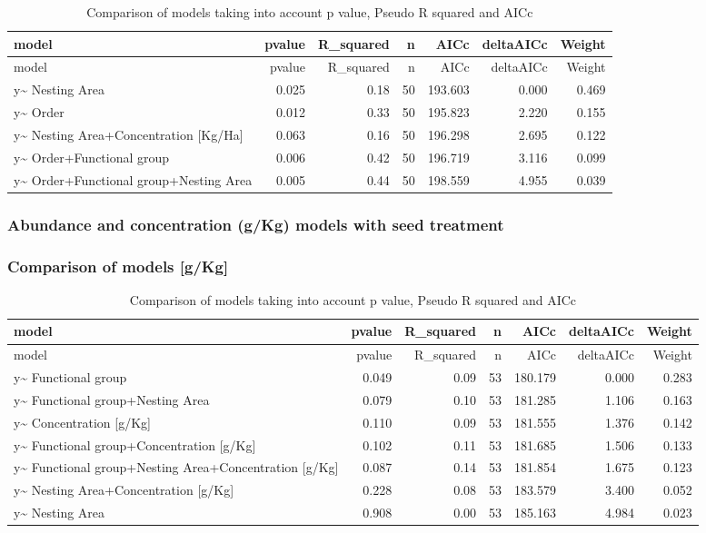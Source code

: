 \documentclass[]{elsarticle} %
\begin{document}
\begin{longtable}[c]{@{}lrrrrrr@{}}
\caption{Comparison of models taking into account p value, Pseudo R
squared and AICc}\tabularnewline
\toprule
model & pvalue & R\_squared & n & AICc & deltaAICc &
Weight\tabularnewline
\midrule
\endfirsthead
\toprule
model & pvalue & R\_squared & n & AICc & deltaAICc &
Weight\tabularnewline
\midrule
\endhead
y\textasciitilde{} Nesting Area & 0.025 & 0.18 & 50 & 193.603 & 0.000 &
0.469\tabularnewline
y\textasciitilde{} Order & 0.012 & 0.33 & 50 & 195.823 & 2.220 &
0.155\tabularnewline
y\textasciitilde{} Nesting Area+Concentration {[}Kg/Ha{]} & 0.063 & 0.16
& 50 & 196.298 & 2.695 & 0.122\tabularnewline
y\textasciitilde{} Order+Functional group & 0.006 & 0.42 & 50 & 196.719
& 3.116 & 0.099\tabularnewline
y\textasciitilde{} Order+Functional group+Nesting Area & 0.005 & 0.44 &
50 & 198.559 & 4.955 & 0.039\tabularnewline
\bottomrule
\end{longtable}

\subsubsection{Abundance and concentration (g/Kg) models with seed
treatment}\label{abundance-and-concentration-gkg-models-with-seed-treatment}

\subsubsection{Comparison of models
{[}g/Kg{]}}\label{comparison-of-models-gkg}

\begin{longtable}[c]{@{}lrrrrrr@{}}
\caption{Comparison of models taking into account p value, Pseudo R
squared and AICc}\tabularnewline
\toprule
model & pvalue & R\_squared & n & AICc & deltaAICc &
Weight\tabularnewline
\midrule
\endfirsthead
\toprule
model & pvalue & R\_squared & n & AICc & deltaAICc &
Weight\tabularnewline
\midrule
\endhead
y\textasciitilde{} Functional group & 0.049 & 0.09 & 53 & 180.179 &
0.000 & 0.283\tabularnewline
y\textasciitilde{} Functional group+Nesting Area & 0.079 & 0.10 & 53 &
181.285 & 1.106 & 0.163\tabularnewline
y\textasciitilde{} Concentration {[}g/Kg{]} & 0.110 & 0.09 & 53 &
181.555 & 1.376 & 0.142\tabularnewline
y\textasciitilde{} Functional group+Concentration {[}g/Kg{]} & 0.102 &
0.11 & 53 & 181.685 & 1.506 & 0.133\tabularnewline
y\textasciitilde{} Functional group+Nesting Area+Concentration
{[}g/Kg{]} & 0.087 & 0.14 & 53 & 181.854 & 1.675 & 0.123\tabularnewline
y\textasciitilde{} Nesting Area+Concentration {[}g/Kg{]} & 0.228 & 0.08
& 53 & 183.579 & 3.400 & 0.052\tabularnewline
y\textasciitilde{} Nesting Area & 0.908 & 0.00 & 53 & 185.163 & 4.984 &
0.023\tabularnewline
\bottomrule
\end{longtable}
\end{document}
